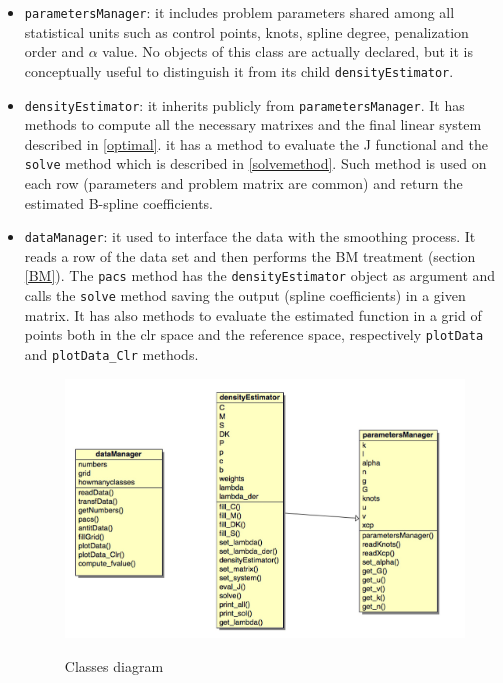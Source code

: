 \begin{itemize}
\item \verb|parametersManager|: it includes problem parameters shared among all statistical units such as control points, knots, spline degree, penalization order and $\alpha$ value. No objects of this class are actually declared, but it is conceptually useful to distinguish it from its child \verb|densityEstimator|.

\item \verb|densityEstimator|: it inherits publicly from \verb|parametersManager|. It has methods to compute all the necessary matrixes and the final linear system described in \ref{optimal}. it has a method to evaluate the J functional and the \verb|solve| method which is described in \ref{solvemethod}. Such method is used on each row (parameters and problem matrix are common) and return the estimated B-spline coefficients.

\item \verb|dataManager|: it used to interface the data with the smoothing process. It reads a row of the data set and then performs the BM treatment (section \ref{BM}). The \verb|pacs| method has the \verb|densityEstimator| object as argument and calls the \verb|solve| method saving the output (spline coefficients) in a given matrix. It has also methods to evaluate the estimated function in a grid of points both in the clr space and the reference space, respectively \verb|plotData| and \verb|plotData_Clr| methods.

\begin{figure}[ht]
	
	
	\includegraphics[width=\textwidth]{./pictures/classes/class_diagram.jpg}
	\label{fig:diagram}

	\caption{Classes diagram}
	\label{fig:diagram}
	
\end{figure}

\end{itemize}

